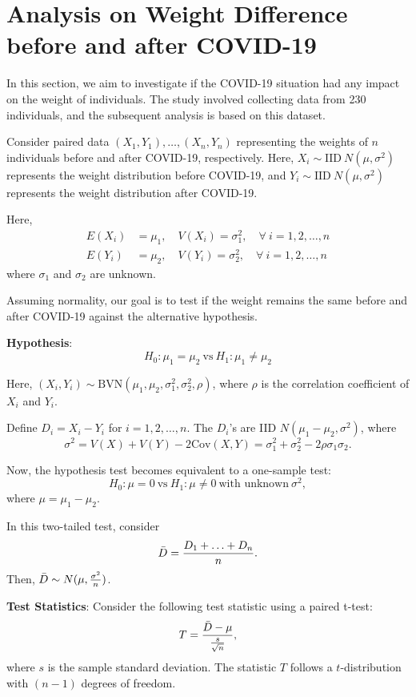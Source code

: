\section{Analysis on Weight Difference before and after COVID-19}

In this section, we aim to investigate if the COVID-19 situation had any impact on the weight of individuals. The study involved collecting data from 230 individuals, and the subsequent analysis is based on this dataset.

Consider paired data $(X_{1}, Y_{1}), \ldots, (X_{n}, Y_{n})$ representing the weights of $n$ individuals before and after COVID-19, respectively. Here, $X_{i} \sim \text{IID} \ N(\mu, \sigma^{2})$ represents the weight distribution before COVID-19, and $Y_{i} \sim \text{IID} \ N(\mu, \sigma^{2})$ represents the weight distribution after COVID-19.

Here, 
$$
\begin{aligned}
    E(X_{i}) &= \mu_{1}, \quad V(X_{i}) = \sigma_{1}^{2}, \quad \forall \ i = 1, 2, \ldots, n \\
    E(Y_{i}) &= \mu_{2}, \quad V(Y_{i}) = \sigma_{2}^{2}, \quad \forall \ i = 1, 2, \ldots, n
\end{aligned}
$$
where $\sigma_{1}$ and $\sigma_{2}$ are unknown.

Assuming normality, our goal is to test if the weight remains the same before and after COVID-19 against the alternative hypothesis.

\textbf{Hypothesis}:
$$H_{0} : \mu_{1} = \mu_{2} \ \text{vs} \ H_{1} : \mu_{1} \neq \mu_{2}$$

Here, $(X_{i}, Y_{i}) \sim \text{BVN} (\mu_{1}, \mu_{2}, \sigma_{1}^{2}, \sigma_{2}^{2}, \rho)$, where $\rho$ is the correlation coefficient of $X_{i}$ and $Y_{i}$.

Define $D_{i} = X_{i} - Y_{i}$ for $i = 1, 2, \ldots, n$. The $D_{i}$'s are IID $N(\mu_{1} - \mu_{2}, \sigma^{2})$, where
$$
\sigma^{2} = V(X) + V(Y) - 2 \text{Cov}(X, Y) = \sigma_{1}^{2} + \sigma_{2}^{2} - 2 \rho \sigma_{1} \sigma_{2}.
$$

Now, the hypothesis test becomes equivalent to a one-sample test:
$$H_{0} : \mu = 0 \ \text{vs} \ H_{1} : \mu \neq 0 \ \text{with unknown} \ \sigma^{2},$$
where $\mu = \mu_{1} - \mu_{2}$.

In this two-tailed test, consider
$$\Bar{D} = \frac{D_{1} + \ldots + D_{n}}{n}.$$
Then, $\Bar{D} \sim N(\mu, \frac{\sigma^{2}}{n})$.

\textbf{Test Statistics}:
Consider the following test statistic using a paired t-test:
$$T = \frac{\Bar{D} - \mu}{\frac{s}{\sqrt{n}}},$$
where $s$ is the sample standard deviation. The statistic $T$ follows a $t$-distribution with $(n-1)$ degrees of freedom.


